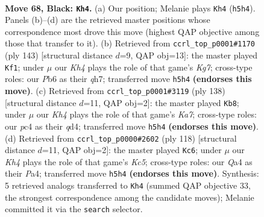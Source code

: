 \documentclass[11pt]{article}
\begin{document}
\clearpage

\begin{figure}[p]\centering
\begin{subfigure}{0.46\textwidth}\centering
\resizebox{\linewidth}{!}{%
\newchessgame
\chessboard[
  setfen={8/8/pp6/7k/q1P5/3K4/8/8 b - - 5 68},
  showmover=false,
  pgfstyle=straightmove, color=movearrow, markmove={h5-h4}
]}
\caption{}
\end{subfigure}\hfill
\begin{subfigure}{0.46\textwidth}\centering
\resizebox{\linewidth}{!}{%
\newchessgame
\chessboard[
  setfen={8/7Q/1K6/p7/8/1Pq5/6k1/8 b - - 3 72},
  showmover=false,
  pgfstyle=straightmove, color=movearrow, markmove={g2-f1}
]}
\caption{}
\end{subfigure}
\\[4pt]
\begin{subfigure}{0.46\textwidth}\centering
\resizebox{\linewidth}{!}{%
\newchessgame
\chessboard[
  setfen={8/K7/8/P7/3q4/Q4p2/8/5k2 w - - 6 70},
  showmover=false,
  pgfstyle=straightmove, color=movearrow, markmove={a7-b8}
]}
\caption{}
\end{subfigure}\hfill
\begin{subfigure}{0.46\textwidth}\centering
\resizebox{\linewidth}{!}{%
\newchessgame
\chessboard[
  setfen={8/5k2/3P4/p1K5/Pp6/8/8/8 w - - 3 60},
  showmover=false,
  pgfstyle=straightmove, color=movearrow, markmove={c5-c6}
]}
\caption{}
\end{subfigure}
\caption{\textbf{Move 68, Black: \texttt{Kh4}.} (a) Our position; Melanie plays \texttt{Kh4} (\texttt{h5h4}). Panels (b)--(d) are the retrieved master positions whose correspondence most drove this move (highest QAP objective among those that transfer to it). (b) Retrieved from \texttt{ccrl\_top\_p0001\#1170} (ply 143) [structural distance $d$=9, QAP obj=13]: the master played \texttt{Kf1}; under $\mu$ our \emph{Kh4} plays the role of that game's \emph{Kg7}; cross-type roles: our \emph{P}b6 as their \emph{q}h7; transferred move \texttt{h5h4} \textbf{(endorses this move)}. (c) Retrieved from \texttt{ccrl\_top\_p0001\#3119} (ply 138) [structural distance $d$=11, QAP obj=2]: the master played \texttt{Kb8}; under $\mu$ our \emph{Kh4} plays the role of that game's \emph{Ka7}; cross-type roles: our \emph{p}c4 as their \emph{q}d4; transferred move \texttt{h5h4} \textbf{(endorses this move)}. (d) Retrieved from \texttt{ccrl\_top\_p0000\#2602} (ply 118) [structural distance $d$=11, QAP obj=2]: the master played \texttt{Kc6}; under $\mu$ our \emph{Kh4} plays the role of that game's \emph{Kc5}; cross-type roles: our \emph{Q}a4 as their \emph{P}a4; transferred move \texttt{h5h4} \textbf{(endorses this move)}. Synthesis: 5 retrieved analogs transferred to \texttt{Kh4} (summed QAP objective 33, the strongest correspondence among the candidate moves); Melanie committed it via the \texttt{search} selector.}
\label{fig:thought-m135}
\end{figure}
\end{document}
